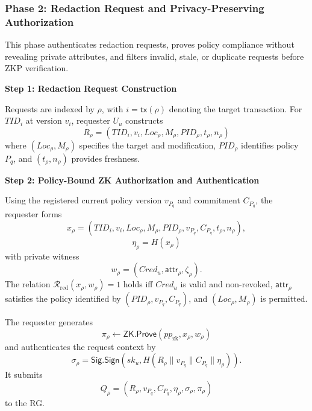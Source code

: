\documentclass[lettersize,journal]{IEEEtran}
\begin{document}
\subsubsection*{\textbf{Phase 2: Redaction Request and Privacy-Preserving Authorization}}
\label{sec:phase2}

This phase authenticates redaction requests, proves policy compliance
without revealing private attributes, and filters invalid, stale, or
duplicate requests before ZKP verification.

\noindent\textbf{Step 1: Redaction Request Construction}

Requests are indexed by $\rho$, with $i=\mathsf{tx}(\rho)$ denoting the
target transaction. For $TID_i$ at version $v_i$, requester $U_u$ constructs
\begin{equation}
R_\rho=
(TID_i,v_i,Loc_\rho,M_\rho,PID_\rho,t_\rho,n_\rho)
\label{eq:redaction-request}
\end{equation}
where $(Loc_\rho,M_\rho)$ specifies the target and modification,
$PID_\rho$ identifies policy $P_q$, and $(t_\rho,n_\rho)$ provides
freshness.

\noindent\textbf{Step 2: Policy-Bound ZK Authorization and Authentication}

Using the registered current policy version $v_{P_q}$ and commitment
$C_{P_q}$, the requester forms
\begin{equation}
x_\rho=
(TID_i,v_i,Loc_\rho,M_\rho,PID_\rho,v_{P_q},C_{P_q},t_\rho,n_\rho),
\label{eq:zk-statement}
\end{equation}
\begin{equation}{
\eta_\rho = H(x_\rho)
}
\end{equation}
with private witness
\begin{equation}
w_\rho=(Cred_u,\mathsf{attr}_\rho,\zeta_\rho).
\label{eq:zk-witness}
\end{equation}
The relation $\mathcal{R}_{\mathrm{red}}(x_\rho,w_\rho)=1$ holds iff
$Cred_u$ is valid and non-revoked, $\mathsf{attr}_\rho$ satisfies the
policy identified by $(PID_\rho,v_{P_q},C_{P_q})$, and
$(Loc_\rho,M_\rho)$ is permitted.

The requester generates
\begin{equation}
\pi_\rho\leftarrow
\mathsf{ZK.Prove}(pp_{\mathrm{zk}},x_\rho,w_\rho)
\label{eq:zk-proof}
\end{equation}
and authenticates the request context by
\begin{equation}
\sigma_\rho=
\mathsf{Sig.Sign}
\left(
sk_u,H(R_\rho\parallel v_{P_q}\parallel C_{P_q}\parallel\eta_\rho)
\right).
\label{eq:request-signature}
\end{equation}
It submits
\begin{equation}
Q_\rho=
(R_\rho,v_{P_q},C_{P_q},\eta_\rho,\sigma_\rho,\pi_\rho)
\label{eq:redaction-query}
\end{equation}
to the RG.
\end{document}
